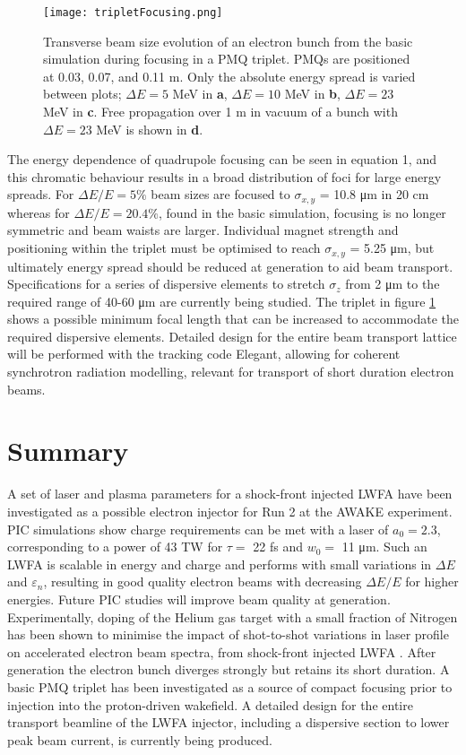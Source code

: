 \documentclass[preprint,5p,times,sort&compress]{elsarticle}
\begin{document}
\begin{figure}[htb]\centering
	\texttt{[image: tripletFocusing.png]}
	\caption{Transverse beam size evolution of an electron bunch from the basic simulation during focusing in a PMQ triplet. PMQs are positioned at 0.03, 0.07, and 0.11 m. Only the absolute energy spread is varied between plots; $\Delta E = 5$ MeV in \textbf{a}, $\Delta E = 10$ MeV in \textbf{b}, $\Delta E = 23$ MeV in \textbf{c}. Free propagation over 1 m in vacuum of a bunch with $\Delta E = 23$ MeV is shown in \textbf{d}.}
	\label{fig:tripletFocusing} 
\end{figure}

The energy dependence of quadrupole focusing can be seen in equation 1, and this chromatic behaviour results in a broad distribution of foci for large energy spreads. For $\Delta E/E = 5\%$ beam sizes are focused to $\sigma_{x,y}$ = 10.8 \si{\micro\metre} in 20 \si{\centi\metre} whereas for $\Delta E/E = 20.4\%$, found in the basic simulation, focusing is no longer symmetric and beam waists are larger. Individual magnet strength and positioning within the triplet must be optimised to reach $\sigma_{x,y}$ = 5.25 \si{\micro\metre}, but ultimately energy spread should be reduced at generation to aid beam transport. Specifications for a series of dispersive elements to stretch $\sigma_z$ from 2 \si{\micro\meter} to the required range of 40-60 \si{\micro\meter} are currently being studied. The triplet in figure \ref{fig:tripletFocusing} shows a possible minimum focal length that can be increased to accommodate the required dispersive elements. Detailed design for the entire beam transport lattice will be performed with the tracking code Elegant, allowing for coherent synchrotron radiation modelling, relevant for transport of short duration electron beams.
 
\section{Summary}

A set of laser and plasma parameters for a shock-front injected LWFA have been investigated as a possible electron injector for Run 2 at the AWAKE experiment. PIC simulations show charge requirements can be met with a laser of $a_0 = 2.3$, corresponding to a power of 43 TW for $\tau=$ 22 fs and $w_0=$ 11 \si{\micro\meter}. Such an LWFA is scalable in energy and charge and performs with small variations in $\Delta E$ and $\varepsilon_n$, resulting in good quality electron beams with decreasing $\Delta E / E$ for higher energies. Future PIC studies will improve beam quality at generation. Experimentally, doping of the Helium gas target with a small fraction of Nitrogen has been shown to minimise the impact of shot-to-shot variations in laser profile on accelerated electron beam spectra, from shock-front injected LWFA \cite{Thaury2015}. After generation the electron bunch diverges strongly but retains its short duration. A basic PMQ triplet has been investigated as a source of compact focusing prior to injection into the proton-driven wakefield. A detailed design for the entire transport beamline of the LWFA injector, including a dispersive section to lower peak beam current, is currently being produced.     
\end{document}

